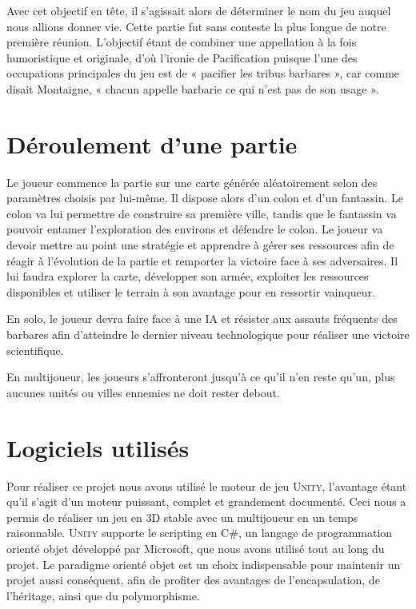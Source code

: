 \documentclass[12pt]{report}
\begin{document}
Avec cet objectif en tête, il s’agissait alors de déterminer le nom  du jeu
auquel nous allions donner vie. Cette partie fut sans conteste la plus longue de
notre première réunion. L’objectif étant de combiner une appellation à la fois
humoristique et originale, d’où l’ironie de Pacification puisque l’une des
occupations principales du jeu est de « pacifier les tribus barbares », car
comme disait Montaigne, « chacun appelle barbarie ce qui n’est pas de son usage
».

\section{Déroulement d’une partie}

Le joueur commence la partie sur une carte générée aléatoirement selon des
paramètres choisis par lui-même. Il dispose alors d’un colon et d’un fantassin.
Le colon va lui permettre de construire sa première ville, tandis que le
fantassin va pouvoir entamer l’exploration des environs et défendre le colon. Le
joueur va devoir mettre au point une stratégie et apprendre à gérer ses
ressources afin de réagir à l’évolution de la partie et remporter la victoire
face à ses adversaires. Il lui faudra explorer la carte, développer son armée,
exploiter les ressources disponibles et utiliser le terrain à son avantage pour
en ressortir vainqueur.

En solo, le joueur devra faire face à une IA et résister aux assauts fréquents
des barbares afin d’atteindre le dernier niveau technologique pour réaliser une
victoire scientifique.

En multijoueur, les joueurs s’affronteront jusqu’à ce qu’il n’en reste qu’un,
plus aucunes unités ou villes ennemies ne doit rester debout.

\section{Logiciels utilisés}

Pour réaliser ce projet nous avons utilisé le moteur de jeu \textsc{Unity},
l’avantage étant qu’il s’agit d’un moteur puissant, complet et grandement
documenté. Ceci nous a permis de réaliser un jeu en 3D stable avec un
multijoueur en un temps raisonnable. \textsc{Unity} supporte le scripting en
C\#, un langage de programmation orienté objet développé par Microsoft, que nous
avons utilisé tout au long du projet. Le paradigme orienté objet est un choix
indispensable pour maintenir un projet aussi conséquent, afin de profiter des
avantages de l’encapsulation, de l’héritage, ainsi que du polymorphisme.
\end{document}
